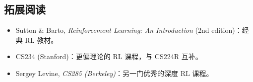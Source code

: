 \documentclass[a4paper]{article}
\begin{document}
\subsection{拓展阅读}
\begin{itemize}
    \item Sutton \& Barto, \textit{Reinforcement Learning: An Introduction} (2nd edition)：经典 RL 教材。
    \item CS234 (Stanford)：更偏理论的 RL 课程，与 CS224R 互补。
    \item Sergey Levine, \textit{CS285 (Berkeley)}：另一门优秀的深度 RL 课程。
\end{itemize}

\end{document}
